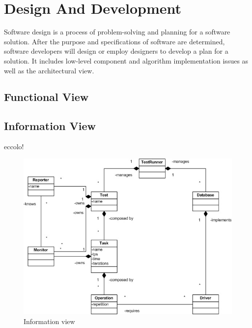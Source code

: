 	\section{Design And Development}
Software design is a process of problem-solving and planning for a software solution. After the purpose and specifications of software are determined, software developers will design or employ designers to develop a plan for a solution. It includes low-level component and algorithm implementation issues as well as the architectural view.

		\subsection{Functional View}
		
		\subsection{Information View}
		eccolo!
\begin{figure}[htp!] 
	\begin{center}
		\includegraphics[width=13cm]{img/uml.jpg}	
	\end{center}
	\caption{Information view}
	\label{information-view}	
\end{figure}
		
